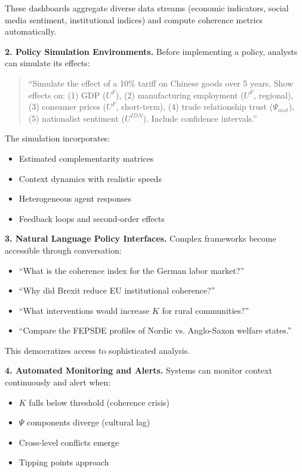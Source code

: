 \documentclass[12pt,a4paper]{article}
\begin{document}
These dashboards aggregate diverse data streams
(economic indicators, social media sentiment, institutional indices)
and compute coherence metrics automatically.

\textbf{2. Policy Simulation Environments.}
Before implementing a policy, analysts can simulate its effects:
\begin{quote}
``Simulate the effect of a 10\% tariff on Chinese goods over 5 years.
Show effects on: (1) GDP ($U^F$), (2) manufacturing employment ($U^F$, regional),
(3) consumer prices ($U^F$, short-term), (4) trade relationship trust ($\Psi_{inst}$),
(5) nationalist sentiment ($U^{IDN}$). Include confidence intervals.''
\end{quote}

The simulation incorporates:
\begin{itemize}
  \item Estimated complementarity matrices
  \item Context dynamics with realistic speeds
  \item Heterogeneous agent responses
  \item Feedback loops and second-order effects
\end{itemize}

\textbf{3. Natural Language Policy Interfaces.}
Complex frameworks become accessible through conversation:
\begin{itemize}
  \item ``What is the coherence index for the German labor market?''
  \item ``Why did Brexit reduce EU institutional coherence?''
  \item ``What interventions would increase $K$ for rural communities?''
  \item ``Compare the FEPSDE profiles of Nordic vs. Anglo-Saxon welfare states.''
\end{itemize}

This democratizes access to sophisticated analysis.

\textbf{4. Automated Monitoring and Alerts.}
Systems can monitor context continuously and alert when:
\begin{itemize}
  \item $K$ falls below threshold (coherence crisis)
  \item $\Psi$ components diverge (cultural lag)
  \item Cross-level conflicts emerge
  \item Tipping points approach
\end{itemize}
\end{document}
